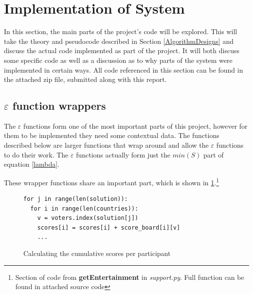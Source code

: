 \documentclass[12pt]{report}
\begin{document}
\section{Implementation of System}\label{Implementation}
In this section, the main parts of the project's code will be explored. This will take the theory and pseudocode described in Section \ref{AlgorithmDesigns} and discuss the actual code implemented as part of the project. It will both discuss some specific code as well as a discussion as to why parts of the system were implemented in certain ways. All code referenced in this section can be found in the attached zip file, submitted along with this report.

\subsection{$\varepsilon$ function wrappers}\label{Imp-Ewrappers}
The $\varepsilon$ functions form one of the most important parts of this project, however for them to be implemented they need some contextual data. The functions described below are larger functions that wrap around and allow the $\varepsilon$ functions to do their work. The $\varepsilon$ functions actually form just the $min(S)$ part of equation \ref{lambda}. 

These wrapper functions share an important part, which is shown in \ref{findScores}.\footnote{Section of code from \textbf{getEntertainment} in \textit{support.py}. Full function can be found in attached source code}

\begin{figure}[H]
\caption{Calculating the cumulative scores per participant}
\label{findScores}
\begin{lstlisting}
for j in range(len(solution)):
  for i in range(len(countries)):
    v = voters.index(solution[j])
    scores[i] = scores[i] + score_board[i][v]
    ...
\end{lstlisting}
\end{figure}
\end{document}
